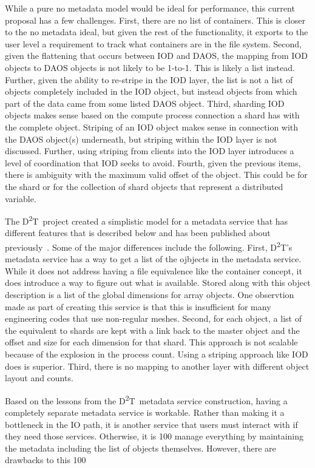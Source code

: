 \documentclass[conference]{sig-alt-gov2}
\newcommand{\DDT}{D\textsuperscript{2}T~}
\newcommand{\DDTns}{D\textsuperscript{2}T}
\begin{document}
While a pure no metadata model would be ideal for performance, this current
proposal has a few challenges. First, there are no list of containers. This
is closer to the no metadata ideal, but given the rest of the functionality,
it exports to the user level a requirement to track what containers are in the
file system. Second, given the flattening that occurs between IOD and DAOS,
the mapping from IOD objects to DAOS objects is not likely to be 1-to-1. This
is likely a list instead. Further, given the ability to re-stripe in the IOD
layer, the list is not a list of objects completely included in the IOD object,
but instead objects from which part of the data came from some listed DAOS
object.  Third, sharding IOD objects makes sense based on the compute process
connection a shard has with the complete object. Striping of an IOD object
makes sense in connection with the DAOS object(s) underneath, but striping
within the IOD layer is not discussed. Further, using striping from clients
into the IOD layer introduces a level of coordination that IOD seeks to avoid.
Fourth, given the previous items, there is ambiguity with the maximum valid
offset of the object. This could be for the shard or for the collection of
shard objects that represent a distributed variable.

The \DDT project created a simplistic model for a metadata service that has
different features that is described below and has been published about
previously~\cite{lofstead:2012:txn-metadata}. Some of the major differences
include the following. First, \DDTns's metadata service has a way to get a list
of the ojbjects in the metadata service. While it does not address having a
file equivalence like the container concept, it does introduce a way to figure
out what is available. Stored along with this object description is a list of
the global dimensions for array objects. One observtion made as part of
creating this service is that this is insufficient for many engineering codes
that use non-regular meshes. Second, for each object, a list of the equivalent
to shards are kept with a link back to the master object and the offset and
size for each dimension for that shard. This approach is not scalable because
of the explosion in the process count. Using a striping approach like IOD does
is superior. Third, there is no mapping to another layer with different object
layout and counts.

Based on the lessons from the \DDT metadata service construction, having a
completely separate metadata service is workable. Rather than making it a
bottleneck in the IO path, it is another service that users must interact with
if they need those services. Otherwise, it is 100%
manage everything by maintaining the metadata including the list of objects
themselves. However, there are drawbacks to this 100%
\end{document}
